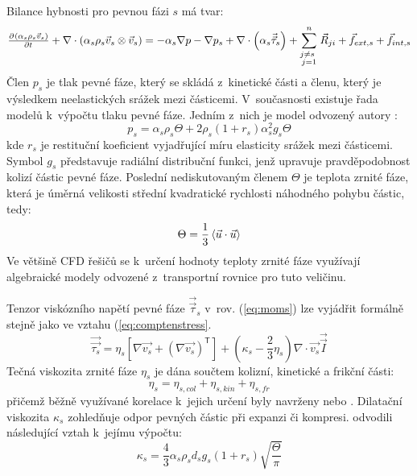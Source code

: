 Bilance hybnosti pro pevnou fázi $s$ má tvar:
\begin{equation}
	\pd{\kula{\alpha_{s}\rho_{s}\vec{v}_{s}}}{t} + \nabla \cdot \kula{\alpha_{s}\rho_{s} \vec{v}_{s} \otimes \vec{v}_{s}} = -\alpha_{s} \nabla p - \nabla p_{s} + \nabla \cdot \left(\alpha_{s} \vec{\vec{\tau}}_{s} \right) +\sum_{\substack{ j \neq s~\\ j=1}}^{n} \vec{R}_{ji} + \vec{f}_{ext,s} + \vec{f}_{int,s}
	\label{eq:moms}
\end{equation}
Člen $p_{s}$ je tlak pevné fáze, který se skládá z~kinetické části a členu, který je výsledkem neelastických srážek mezi částicemi. V~současnosti existuje řada modelů k~výpočtu tlaku pevné fáze. Jedním z~nich je model odvozený autory \citet{lun84}:
\begin{equation}
	p_{s} = \alpha_{s}\rho_{s}\Theta + 2\rho_{s}\left(1 + r_{s} \right) \alpha_{s}^{2}g_{s}\Theta
	\label{eq:ps}
\end{equation}
kde $r_{s}$ je restituční koeficient vyjadřující míru elasticity srážek mezi částicemi. Symbol $g_{s}$ představuje radiální distribuční funkci, jenž upravuje pravděpodobnost kolizí částic pevné fáze. Poslední nediskutovaným členem $\Theta$ je teplota zrnité fáze, která je úměrná velikosti střední kvadratické rychlosti náhodného pohybu částic, tedy: 
\begin{equation}
	\Theta = \frac{1}{3} \left<  \vec{u} \cdot \vec{u} \right>
	\label{eq:gtemp}
\end{equation}
Ve většině CFD řešičů se k~určení hodnoty teploty zrnité fáze využívají algebraické modely odvozené z~transportní rovnice pro tuto veličinu.

Tenzor viskózního napětí pevné fáze $\vec{\vec{\tau}}_{s}$ v~rov. (\ref{eq:moms}) lze vyjádřit formálně stejně jako ve vztahu (\ref{eq:comptenstress}. 
\begin{equation}
	\vec{\vec{\tau_{s}}} = \eta_{s} \left[ \nabla \vec{v_{s}} +  \left( \nabla \vec{v_{s}} \right)^{\mathsf{T}}\right] +  \left( \kappa_{s} -\frac{2}{3} \eta_{s} \right) \nabla \cdot \vec{v_{s}} \vec{\vec{I}}
	\label{eq:solidstress}
\end{equation}
Tečná viskozita zrnité fáze $\eta_{s}$ je dána součtem kolizní, kinetické a frikční části:
\begin{equation}
	\eta_{s} = \eta_{s,col}  + \eta_{s,kin} + \eta_{s,fr} 
	\label{eq:nys}
\end{equation}
přičemž běžně využívané korelace k~jejich určení byly navrženy \citet{gid92} nebo \citet{syam93}. Dilatační viskozita $\kappa_{s}$ zohledňuje odpor pevných částic při expanzi či kompresi. \citet{lun84} odvodili následující vztah k~jejímu výpočtu:
\begin{equation}
	\kappa_{s} = \frac{4}{3}\alpha_{s}\rho_{s}d_{s}g_{s}\left(1 + r_{s} \right)\sqrt{\frac{\Theta}{\pi}}
	\label{eq:dilvis}
\end{equation}
 

